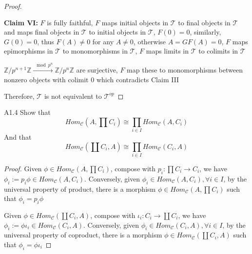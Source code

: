 \documentclass[main]{subfiles}
\begin{document}
\begin{proof}
\begin{center}
\end{center}
\textbf{Claim VI: }$F$ is fully faithful, $F$ maps initial objects in $\mathcal T$ to final objects in $\mathcal T$ and maps final objects in $\mathcal T$ to initial objects in $\mathcal T$, $F(0)=0$, similarly, $G(0)=0$, thus $F(A)\neq0$ for any $A\neq0$, otherwise $A=GF(A)=0$, $F$ maps epimorphisms in $\mathcal T$ to monomorphisms in $\mathcal T$, $F$ maps limits in $\mathcal T$ to colimits in $\mathcal T$ \par
$\mathbb Z/p^{n+1}\mathbb Z\xrightarrow{\mod p^n}\mathbb Z/p^n\mathbb Z$ are surjective, $F$ map these to monomorphisms between nonzero objects with colimit $0$ which contradicts Claim III \par
Therefore, $\mathcal T$ is not equivalent to $\mathcal T^{op}$
\end{proof}

\begin{customexercise}{A1.4}
Show that 
\[Hom_{\mathcal C}\left(A,\prod C_i\right)\cong\prod_{i\in I}Hom_{\mathcal C}\left(A,C_i\right)\]
And that 
\[Hom_{\mathcal C}\left(\coprod C_i,A\right)\cong\prod_{i\in I}Hom_{\mathcal C}\left(C_i,A\right)\]
\end{customexercise}

\begin{proof}
Given $\phi\in Hom_{\mathcal C}\left(A,\prod C_i\right)$, compose with $p_i:\prod C_i\to C_i$, we have $\phi_i:=p_i\phi\in Hom_{\mathcal C}\left(A,C_i\right)$. Conversely, given $\phi_i\in Hom_{\mathcal C}\left(A,C_i\right),\forall i\in I$, by the universal property of product, there is a morphism $\phi\in Hom_{\mathcal C}\left(A,\prod C_i\right)$ such that $\phi_i=p_i\phi$ \par
Given $\phi\in Hom_{\mathcal C}\left(\coprod C_i,A\right)$, compose with $\iota_i:C_i\to\coprod C_i$, we have $\phi_i:=\phi\iota_i\in Hom_{\mathcal C}\left(C_i,A\right)$. Conversely, given $\phi_i\in Hom_{\mathcal C}\left(C_i,A\right),\forall i\in I$, by the universal property of coproduct, there is a morphism $\phi\in Hom_{\mathcal C}\left(\coprod C_i,A\right)$ such that $\phi_i=\phi\iota_i$
\end{proof}
\end{document}
